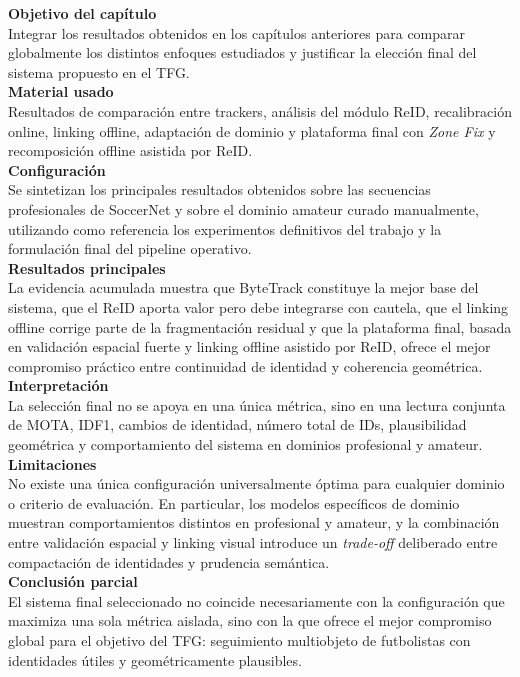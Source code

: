 \documentclass[../MAIN.tex]{subfiles}
\begin{document}
	\begin{chaptertemplatebox}
		\textbf{Objetivo del capítulo}\\
		Integrar los resultados obtenidos en los capítulos anteriores para comparar globalmente los distintos enfoques estudiados y justificar la elección final del sistema propuesto en el TFG.\\[0.5em]
		
		\textbf{Material usado}\\
		Resultados de comparación entre trackers, análisis del módulo ReID, recalibración online, linking offline, adaptación de dominio y plataforma final con \textit{Zone Fix} y recomposición offline asistida por ReID.\\[0.5em]
		
		\textbf{Configuración}\\
		Se sintetizan los principales resultados obtenidos sobre las secuencias profesionales de SoccerNet y sobre el dominio amateur curado manualmente, utilizando como referencia los experimentos definitivos del trabajo y la formulación final del pipeline operativo.\\[0.5em]
		
		\textbf{Resultados principales}\\
		La evidencia acumulada muestra que ByteTrack constituye la mejor base del sistema, que el ReID aporta valor pero debe integrarse con cautela, que el linking offline corrige parte de la fragmentación residual y que la plataforma final, basada en validación espacial fuerte y linking offline asistido por ReID, ofrece el mejor compromiso práctico entre continuidad de identidad y coherencia geométrica.\\[0.5em]
		
		\textbf{Interpretación}\\
		La selección final no se apoya en una única métrica, sino en una lectura conjunta de MOTA, IDF1, cambios de identidad, número total de IDs, plausibilidad geométrica y comportamiento del sistema en dominios profesional y amateur.\\[0.5em]
		
		\textbf{Limitaciones}\\
		No existe una única configuración universalmente óptima para cualquier dominio o criterio de evaluación. En particular, los modelos específicos de dominio muestran comportamientos distintos en profesional y amateur, y la combinación entre validación espacial y linking visual introduce un \textit{trade-off} deliberado entre compactación de identidades y prudencia semántica.\\[0.5em]
		
		\textbf{Conclusión parcial}\\
		El sistema final seleccionado no coincide necesariamente con la configuración que maximiza una sola métrica aislada, sino con la que ofrece el mejor compromiso global para el objetivo del TFG: seguimiento multiobjeto de futbolistas con identidades útiles y geométricamente plausibles.
	\end{chaptertemplatebox}
	
\end{document}
